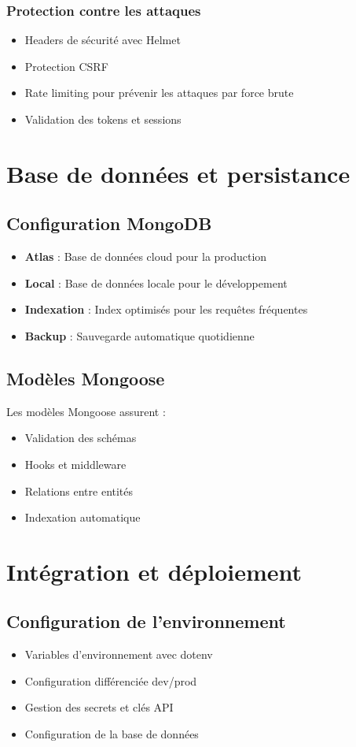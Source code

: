 \subsubsection{Protection contre les attaques}
\begin{itemize}
    \item Headers de sécurité avec Helmet
    \item Protection CSRF
    \item Rate limiting pour prévenir les attaques par force brute
    \item Validation des tokens et sessions
\end{itemize}

\section{Base de données et persistance}
\subsection{Configuration MongoDB}
\begin{itemize}
    \item \textbf{Atlas} : Base de données cloud pour la production
    \item \textbf{Local} : Base de données locale pour le développement
    \item \textbf{Indexation} : Index optimisés pour les requêtes fréquentes
    \item \textbf{Backup} : Sauvegarde automatique quotidienne
\end{itemize}

\subsection{Modèles Mongoose}
Les modèles Mongoose assurent :
\begin{itemize}
    \item Validation des schémas
    \item Hooks et middleware
    \item Relations entre entités
    \item Indexation automatique
\end{itemize}

\section{Intégration et déploiement}
\subsection{Configuration de l'environnement}
\begin{itemize}
    \item Variables d'environnement avec dotenv
    \item Configuration différenciée dev/prod
    \item Gestion des secrets et clés API
    \item Configuration de la base de données
\end{itemize}

